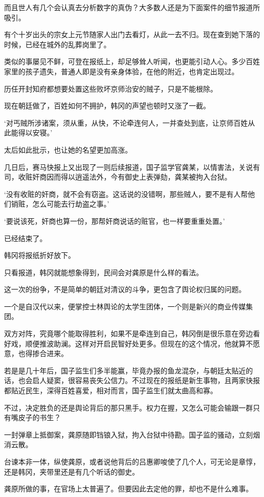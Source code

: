 而且世人有几个会认真去分析数字的真伪？大多数人还是为下面案件的细节报道所吸引。

有个十岁出头的宗女上元节随家人出门去看灯，从此一去不归。现在查到她下落的时候，已经在城外的乱葬岗里了。

类似的事屡见不鲜，可登在报纸上，却足够耸人听闻，也更能引动人心。多少百姓家里的孩子遗失，普通人即是没有亲身体验，在他的附近，也肯定出现过。

历任开封知府都想要处置这些败坏京师治安的贼子，只是不能根除。

现在朝廷做了，百姓如何不拥护，韩冈的声望也顿时又涨了一截。

‘对丐贼所涉诸案，须从重，从快，不论牵连何人，一并查处到底，让京师百姓从此能得以安寝。’

太后如此批示，也让她的名望更加高涨。

几日后，赛马快报上又出现了一则后续报道，国子监学官龚某，以情害法，关说有司，收赃奸商因而得以逍遥法外，今有御史上表弹劾，龚某被拘入台狱。

‘没有收赃的奸商，就不会有窃盗。这话说的没错啊，那些贼人，要不是有人帮他们销赃，怎么可能去行劫盗之事。’

‘要说该死，奸商也算一份，那帮奸商说话的赃官，也一样要重重处置。’

已经结束了。

韩冈将报纸折好放下。

只看报道，韩冈就能想象得到，民间会对龚原是什么样的看法。

这一次的纷争，不是简单的朝廷对清议的斗争，更包含了舆论权归属的问题。

一个是自汉代以来，便掌控士林舆论的太学生团体，一个则是新兴的商业传媒集团。

双方对阵，究竟哪个能取得胜利，如果不是牵连到自己，韩冈倒是很乐意在旁边看好戏，顺便推波助澜。这样对开启民智好处更多。但现在的这个情况，他就算不愿意，也得掺合进来。

若是是几十年后，国子监生们多半能赢，毕竟办报的鱼龙混杂，与朝廷太贴近的话，也会启人疑窦，很容易丧失公信力。不过现在的报纸是新生事物，且两家快报都贴近民生，深得百姓喜爱，相对而言，国子监生们就太曲高和寡。

不过，决定胜负的还是舆论背后的那只黑手。权力在握，又怎么可能会输跟一群只有嘴皮子的书生？

一封弹章上抵御案，龚原随即铛锒入狱，拘入台狱中待勘。国子监的骚动，立刻烟消云散。

台谏本非一体，纵使龚原，或者说他背后的吕惠卿唆使了几个人，可无论是章惇，还是韩冈，夹带里还是有几个听话的御史。

龚原所做的事，在官场上太普遍了。但要因此去定他的罪，却也不是什么难事。

